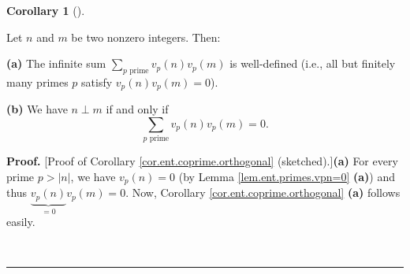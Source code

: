 \documentclass[numbers=enddot,12pt,final,onecolumn,notitlepage]{scrartcl}%
\numberwithin{exer}{subsection}
\theoremstyle{definition}
\newtheorem{coro}[theo]{Corollary}
\newenvironment{corollary}[1][]
{\begin{coro}[#1]\begin{leftbar}}
{\end{leftbar}\end{coro}}
\newenvironment{proof}[1][Proof]{\noindent\textbf{#1.} }{\ \rule{0.5em}{0.5em}}
\let\sumnonlimits\sum
\renewcommand{\sum}{\sumnonlimits\limits}
\begin{document}
\begin{corollary}
\label{cor.ent.coprime.orthogonal}Let $n$ and $m$ be two nonzero integers. Then:

\textbf{(a)} The infinite sum $\sum_{p\text{ prime}}v_{p}\left(  n\right)
v_{p}\left(  m\right)  $ is well-defined (i.e., all but finitely many primes
$p$ satisfy $v_{p}\left(  n\right)  v_{p}\left(  m\right)  =0$).

\textbf{(b)} We have $n\perp m$ if and only if
\[
\sum_{p\text{ prime}}v_{p}\left(  n\right)  v_{p}\left(  m\right)  =0.
\]

\end{corollary}

\begin{proof}
[Proof of Corollary \ref{cor.ent.coprime.orthogonal} (sketched).]\textbf{(a)}
For every prime $p>\left\vert n\right\vert $, we have $v_{p}\left(  n\right)
=0$ (by Lemma \ref{lem.ent.primes.vpn=0} \textbf{(a)}) and thus
$\underbrace{v_{p}\left(  n\right)  }_{=0}v_{p}\left(  m\right)  =0$. Now,
Corollary \ref{cor.ent.coprime.orthogonal} \textbf{(a)} follows easily.


\end{proof}
\end{document}
